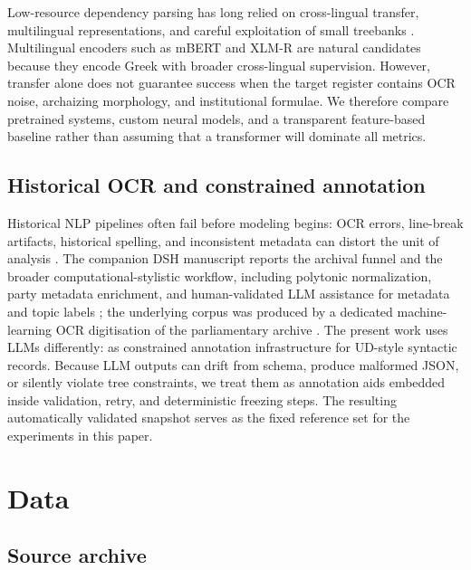 \documentclass[11pt]{article}
\begin{document}
Low-resource dependency parsing has long relied on cross-lingual transfer, multilingual representations, and careful exploitation of small treebanks \cite{duong2015lowresource,wu2018multilingual,kondratyuk2019udify}. Multilingual encoders such as mBERT \cite{devlin2019bert} and XLM-R \cite{conneau2020xlmr} are natural candidates because they encode Greek with broader cross-lingual supervision. However, transfer alone does not guarantee success when the target register contains OCR noise, archaizing morphology, and institutional formulae. We therefore compare pretrained systems, custom neural models, and a transparent feature-based baseline rather than assuming that a transformer will dominate all metrics.

\subsection{Historical OCR and constrained annotation}

Historical NLP pipelines often fail before modeling begins: OCR errors, line-break artifacts, historical spelling, and inconsistent metadata can distort the unit of analysis \cite{richter2018ocr,makarov2020normalization}. The companion DSH manuscript reports the archival funnel and the broader computational-stylistic workflow, including polytonic normalization, party metadata enrichment, and human-validated LLM assistance for metadata and topic labels \cite{mikrosfitsilis2025dsh}; the underlying corpus was produced by a dedicated machine-learning OCR digitisation of the parliamentary archive \cite{fitsilis2024digitization}. The present work uses LLMs differently: as constrained annotation infrastructure for UD-style syntactic records. Because LLM outputs can drift from schema, produce malformed JSON, or silently violate tree constraints, we treat them as annotation aids embedded inside validation, retry, and deterministic freezing steps. The resulting automatically validated snapshot serves as the fixed reference set for the experiments in this paper.

\section{Data}

\subsection{Source archive}
\end{document}
